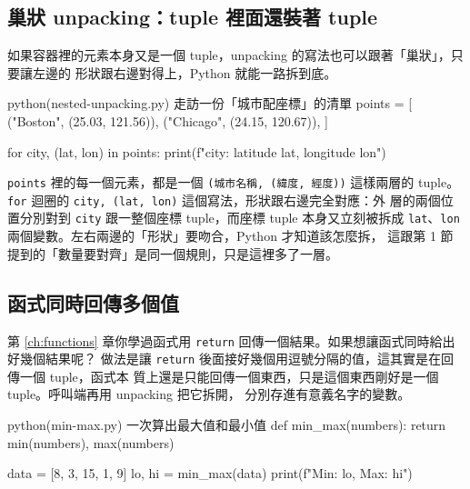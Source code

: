 
\subsection*{巢狀 unpacking：tuple 裡面還裝著 tuple}

如果容器裡的元素本身又是一個 tuple，unpacking 的寫法也可以跟著「巢狀」，只要讓左邊的
形狀跟右邊對得上，Python 就能一路拆到底。

\begin{example}{python}{(nested-unpacking.py) 走訪一份「城市配座標」的清單}
points = [
    ("Boston", (25.03, 121.56)),
    ("Chicago", (24.15, 120.67)),
]

for city, (lat, lon) in points:
    print(f"{city}: latitude {lat}, longitude {lon}")
\end{example}


\texttt{points} 裡的每一個元素，都是一個 \texttt{(城市名稱, (緯度, 經度))} 這樣兩層的
tuple。\texttt{for} 迴圈的 \texttt{city, (lat, lon)} 這個寫法，形狀跟右邊完全對應：外
層的兩個位置分別對到 \texttt{city} 跟一整個座標 tuple，而座標 tuple 本身又立刻被拆成
\texttt{lat}、\texttt{lon} 兩個變數。左右兩邊的「形狀」要吻合，Python 才知道該怎麼拆，
這跟第 1 節提到的「數量要對齊」是同一個規則，只是這裡多了一層。

\subsection*{函式同時回傳多個值}

第 \ref{ch:functions} 章你學過函式用 \texttt{return} 回傳一個結果。如果想讓函式同時給出好幾個結果呢？
做法是讓 \texttt{return} 後面接好幾個用逗號分隔的值，這其實是在回傳一個 tuple，函式本
質上還是只能回傳一個東西，只是這個東西剛好是一個 tuple。呼叫端再用 unpacking 把它拆開，
分別存進有意義名字的變數。

\begin{example}{python}{(min-max.py) 一次算出最大值和最小值}
def min_max(numbers):
    return min(numbers), max(numbers)


data = [8, 3, 15, 1, 9]
lo, hi = min_max(data)
print(f"Min: {lo}, Max: {hi}")
\end{example}

